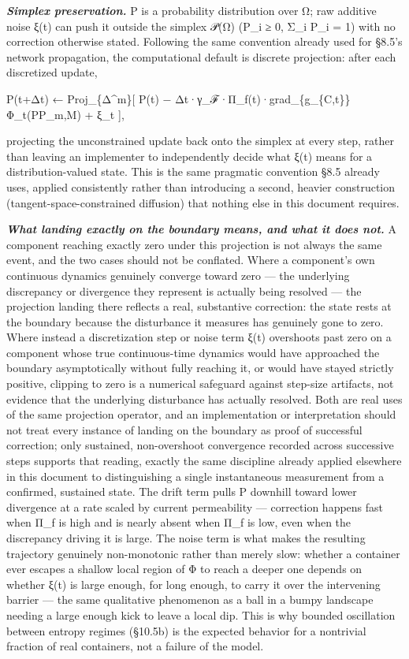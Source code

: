 \documentclass[
]{article}
\begin{document}
\emph{\textbf{Simplex preservation.}} P is a probability distribution
over Ω; raw additive noise ξ(t) can push it outside the simplex 𝒫(Ω)
(P\_i ≥ 0, Σ\_i P\_i = 1) with no correction otherwise stated. Following
the same convention already used for §8.5's network propagation, the
computational default is discrete projection: after each discretized
update,

P(t+Δt) ← Proj\_\{Δ\^{}m\}{[} P(t) −
Δt·γ\_ℱ·Π\_f(t)·grad\_\{g\_\{C,t\}\}Φ\_t(PP\_m,M) + ξ\_t {]},

projecting the unconstrained update back onto the simplex at every step,
rather than leaving an implementer to independently decide what ξ(t)
means for a distribution-valued state. This is the same pragmatic
convention §8.5 already uses, applied consistently rather than
introducing a second, heavier construction (tangent-space-constrained
diffusion) that nothing else in this document requires.

\emph{\textbf{What landing exactly on the boundary means, and what it
does not.}} A component reaching exactly zero under this projection is
not always the same event, and the two cases should not be conflated.
Where a component's own continuous dynamics genuinely converge toward
zero --- the underlying discrepancy or divergence they represent is
actually being resolved --- the projection landing there reflects a
real, substantive correction: the state rests at the boundary because
the disturbance it measures has genuinely gone to zero. Where instead a
discretization step or noise term ξ(t) overshoots past zero on a
component whose true continuous-time dynamics would have approached the
boundary asymptotically without fully reaching it, or would have stayed
strictly positive, clipping to zero is a numerical safeguard against
step-size artifacts, not evidence that the underlying disturbance has
actually resolved. Both are real uses of the same projection operator,
and an implementation or interpretation should not treat every instance
of landing on the boundary as proof of successful correction; only
sustained, non-overshoot convergence recorded across successive steps
supports that reading, exactly the same discipline already applied
elsewhere in this document to distinguishing a single instantaneous
measurement from a confirmed, sustained state. The drift term pulls P
downhill toward lower divergence at a rate scaled by current
permeability --- correction happens fast when Π\_f is high and is nearly
absent when Π\_f is low, even when the discrepancy driving it is large.
The noise term is what makes the resulting trajectory genuinely
non-monotonic rather than merely slow: whether a container ever escapes
a shallow local region of Φ to reach a deeper one depends on whether
ξ(t) is large enough, for long enough, to carry it over the intervening
barrier --- the same qualitative phenomenon as a ball in a bumpy
landscape needing a large enough kick to leave a local dip. This is why
bounded oscillation between entropy regimes (§10.5b) is the expected
behavior for a nontrivial fraction of real containers, not a failure of
the model.
\end{document}
